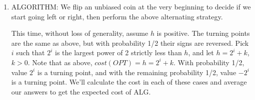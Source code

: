 \documentclass{article}
\begin{document}
\begin{enumerate}


      
      
      
      \item ALGORITHM: We flip an unbiased coin at the very beginning to decide if we start going left or
      right, then perform the above alternating strategy.
      
     
      
      This time, without loss of generality, assume $h$ is positive. The turning points are the same as above, but with probability 1/2 their signs are reversed.  Pick $i$ such that $2^i$ is the largest power of 2 strictly less than $h$, and let $h = 2^i + k$, $k > 0$.  Note that as above, $cost(OPT) = h = 2^i + k$.  With probability 1/2, value $2^i$ is a turning point, and with the remaining probability 1/2, value $-2^i$ is a turning point. We'll calculate the cost in each of these cases and average our answers to get the expected cost of ALG. 
      

\end{enumerate}
\end{document}
